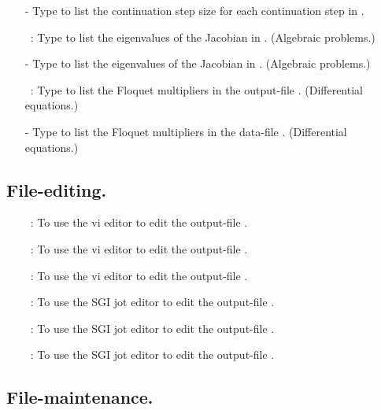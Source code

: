 \begin{itemize}
  \item[-]
   Type  to list the continuation step size for each
  continuation step in . 
\item[\commandf{@ev}]~:
  Type  to list the eigenvalues of the Jacobian 
  in . 
  (Algebraic problems.)
  \item[-]
   Type  to list the eigenvalues of the Jacobian 
  in . 
  (Algebraic problems.)
\item[\commandf{@fl}]~:
  Type  to list the Floquet multipliers
  in the output-file . 
  (Differential equations.)
  \item[-]
   Type  to list the Floquet multipliers 
  in the data-file . 
  (Differential equations.)
\end{itemize}

\subsection{ File-editing.} 

\begin{itemize}

\item[\commandf{@e7}]~:
  To use the vi editor to edit the output-file .
\item[\commandf{@e8}]~:
  To use the vi editor to edit the output-file .
\item[\commandf{@e9}]~:
  To use the vi editor to edit the output-file .
\item[\commandf{@j7}]~:
  To use the SGI jot editor to edit the output-file .
\item[\commandf{@j8}]~:
  To use the SGI jot editor to edit the output-file .
\item[\commandf{@j9}]~:
  To use the SGI jot editor to edit the output-file .
  
\end{itemize}

\subsection{ File-maintenance.} 

